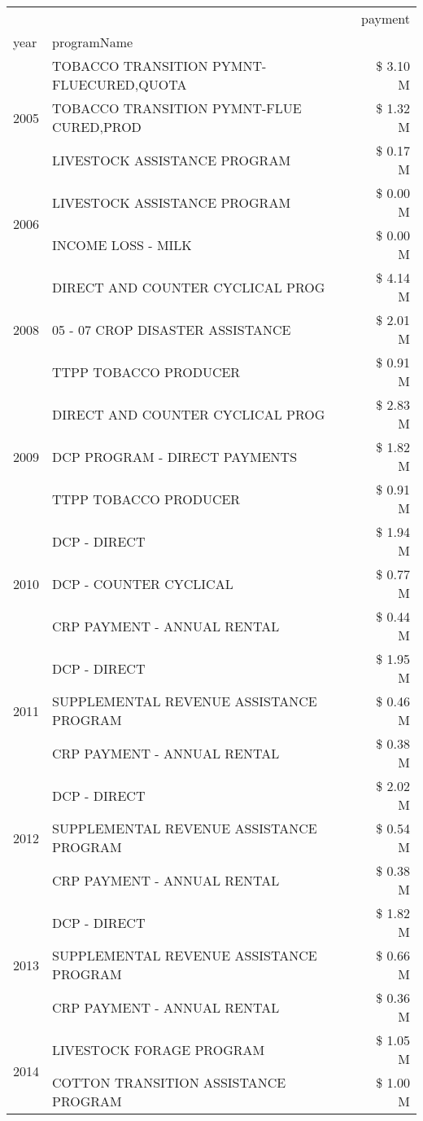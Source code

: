 \begin{tabular}{llr}
\toprule
 &  & payment \\
year & programName &  \\
\midrule
\multirow[t]{3}{*}{2005} & TOBACCO TRANSITION PYMNT-FLUECURED,QUOTA & \$ 3.10 M \\
 & TOBACCO TRANSITION PYMNT-FLUE CURED,PROD & \$ 1.32 M \\
 & LIVESTOCK ASSISTANCE PROGRAM & \$ 0.17 M \\
\cline{1-3}
\multirow[t]{2}{*}{2006} & LIVESTOCK ASSISTANCE PROGRAM & \$ 0.00 M \\
 & INCOME LOSS - MILK & \$ 0.00 M \\
\cline{1-3}
\multirow[t]{3}{*}{2008} & DIRECT AND COUNTER CYCLICAL PROG & \$ 4.14 M \\
 & 05 - 07 CROP DISASTER ASSISTANCE & \$ 2.01 M \\
 & TTPP TOBACCO PRODUCER & \$ 0.91 M \\
\cline{1-3}
\multirow[t]{3}{*}{2009} & DIRECT AND COUNTER CYCLICAL PROG & \$ 2.83 M \\
 & DCP PROGRAM - DIRECT PAYMENTS & \$ 1.82 M \\
 & TTPP TOBACCO PRODUCER & \$ 0.91 M \\
\cline{1-3}
\multirow[t]{3}{*}{2010} & DCP - DIRECT & \$ 1.94 M \\
 & DCP - COUNTER CYCLICAL & \$ 0.77 M \\
 & CRP PAYMENT - ANNUAL RENTAL & \$ 0.44 M \\
\cline{1-3}
\multirow[t]{3}{*}{2011} & DCP - DIRECT & \$ 1.95 M \\
 & SUPPLEMENTAL REVENUE ASSISTANCE PROGRAM & \$ 0.46 M \\
 & CRP PAYMENT - ANNUAL RENTAL & \$ 0.38 M \\
\cline{1-3}
\multirow[t]{3}{*}{2012} & DCP - DIRECT & \$ 2.02 M \\
 & SUPPLEMENTAL REVENUE ASSISTANCE PROGRAM & \$ 0.54 M \\
 & CRP PAYMENT - ANNUAL RENTAL & \$ 0.38 M \\
\cline{1-3}
\multirow[t]{3}{*}{2013} & DCP - DIRECT & \$ 1.82 M \\
 & SUPPLEMENTAL REVENUE ASSISTANCE PROGRAM & \$ 0.66 M \\
 & CRP PAYMENT - ANNUAL RENTAL & \$ 0.36 M \\
\cline{1-3}
\multirow[t]{3}{*}{2014} & LIVESTOCK FORAGE PROGRAM & \$ 1.05 M \\
 & COTTON TRANSITION ASSISTANCE PROGRAM & \$ 1.00 M \\

\end{tabular}
